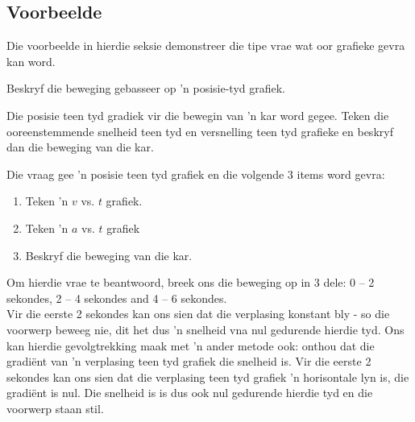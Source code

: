 \subsection*{Voorbeelde}
            \nopagebreak
Die voorbeelde in hierdie seksie demonstreer die tipe vrae wat oor grafieke gevra kan word. 
\clearpage
\begin{wex}{Beskryf die beweging gebasseer op 'n posisie-tyd grafiek.}{Die posisie teen tyd gradiek vir die bewegin van 'n kar word gegee. Teken die ooreenstemmende snelheid teen tyd en versnelling teen tyd grafieke en beskryf dan die beweging van die kar.
\begin{center}
\end{center}
}{%
Die vraag gee 'n posisie teen tyd grafiek en die volgende 3 items word gevra:
\begin{enumerate}[label=\textbf{\arabic*}.]
\item Teken 'n $v$ vs. $t$ grafiek.
\item Teken 'n $a$ vs. $t$ grafiek
\item Beskryf die beweging van die kar.
\end{enumerate}
Om hierdie vrae te beantwoord, breek ons die beweging op in 3 dele: 0 -- 2 sekondes, 2 -- 4 sekondes and 4 -- 6 sekondes.\\

Vir die eerste 2 sekondes kan ons sien dat die verplasing konstant bly - so die voorwerp beweeg nie, dit het dus 'n snelheid vna nul gedurende hierdie tyd. Ons kan hierdie gevolgtrekking maak met 'n ander metode ook: onthou dat die gradi\"ent van 'n verplasing teen tyd grafiek die snelheid is. Vir die eerste 2 sekondes kan ons sien dat die verplasing teen tyd grafiek 'n horisontale lyn is, die gradi\"ent is nul. Die snelheid is is dus ook nul gedurende hierdie tyd en die voorwerp staan stil. \\

}
\end{wex}
